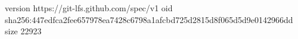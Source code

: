 version https://git-lfs.github.com/spec/v1
oid sha256:447edfca2fee657978ea7428c6798a1afcbd725d2815d8f065d5d9e0142966dd
size 22923
